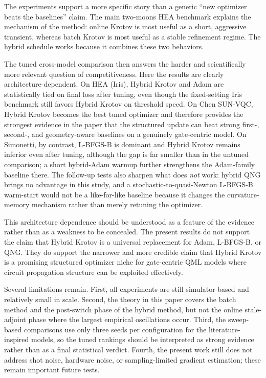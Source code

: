 \documentclass[aps,prb,10pt,twocolumn,superscriptaddress]{revtex4-2}
\begin{document}
The experiments support a more specific story than a generic ``new optimizer beats the baselines'' claim.
The main two-moons HEA benchmark explains the mechanism of the method: online Krotov is most useful as a short, aggressive transient, whereas batch Krotov is most useful as a stable refinement regime.
The hybrid schedule works because it combines these two behaviors.

The tuned cross-model comparison then answers the harder and scientifically more relevant question of competitiveness.
Here the results are clearly architecture-dependent.
On HEA (Iris), Hybrid Krotov and Adam are statistically tied on final loss after tuning, even though the fixed-setting Iris benchmark still favors Hybrid Krotov on threshold speed.
On Chen SUN-VQC, Hybrid Krotov becomes the best tuned optimizer and therefore provides the strongest evidence in the paper that the structured update can beat strong first-, second-, and geometry-aware baselines on a genuinely gate-centric model.
On Simonetti, by contrast, L-BFGS-B is dominant and Hybrid Krotov remains inferior even after tuning, although the gap is far smaller than in the untuned comparison; a short hybrid-Adam warmup further strengthens the Adam-family baseline there.
The follow-up tests also sharpen what does \emph{not} work: hybrid QNG brings no advantage in this study, and a stochastic-to-quasi-Newton L-BFGS-B warm-start would not be a like-for-like baseline because it changes the curvature-memory mechanism rather than merely retuning the optimizer.

This architecture dependence should be understood as a feature of the evidence rather than as a weakness to be concealed.
The present results do not support the claim that Hybrid Krotov is a universal replacement for Adam, L-BFGS-B, or QNG.
They do support the narrower and more credible claim that Hybrid Krotov is a promising structured optimizer niche for gate-centric QML models where circuit propagation structure can be exploited effectively.

Several limitations remain.
First, all experiments are still simulator-based and relatively small in scale.
Second, the theory in this paper covers the batch method and the post-switch phase of the hybrid method, but not the online stale-adjoint phase where the largest empirical oscillations occur.
Third, the sweep-based comparisons use only three seeds per configuration for the literature-inspired models, so the tuned rankings should be interpreted as strong evidence rather than as a final statistical verdict.
Fourth, the present work still does not address shot noise, hardware noise, or sampling-limited gradient estimation; these remain important future tests.
\end{document}
